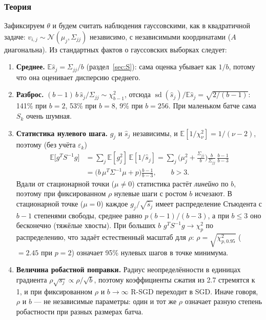 \documentclass[11pt,a4paper]{article}
\newcommand{\E}{\mathbb{E}}
\begin{document}
\subsubsection*{Теория}

Зафиксируем $\theta$ и будем считать наблюдения гауссовскими, как в квадратичной задаче:
$v_{i,j}\sim\mathcal N(\mu_j,\Sigma_{jj})$ независимо, с независимыми координатами
($A$ диагональна). Из стандартных фактов о гауссовских выборках следует:
\begin{enumerate}
\item \textbf{Среднее.} $\E\widehat s_j=\Sigma_{jj}/b$ (раздел~\ref{sec:S}): сама оценка убывает как
$1/b$, потому что она оценивает дисперсию среднего.
\item \textbf{Разброс.} $(b-1)\,b\,\widehat s_j/\Sigma_{jj}\sim\chi^2_{b-1}$, отсюда
$\operatorname{sd}(\widehat s_j)/\E\widehat s_j=\sqrt{2/(b-1)}$: 141\% при $b=2$, 53\%
при $b=8$, 9\% при $b=256$. При маленьком батче сама $S_k$ очень шумная.
\item \textbf{Статистика нулевого шага.} $g_j$ и $\widehat s_j$ независимы, и
$\E[1/\chi^2_\nu]=1/(\nu-2)$, поэтому (без учёта $\varepsilon_k$)
\begin{align*}
\E\big[g^TS^{-1}g\big]&=\sum_j\E[g_j^2]\,\E[1/\widehat s_j]
=\sum_j\Big(\mu_j^2+\frac{\Sigma_{jj}}b\Big)\frac{b}{\Sigma_{jj}}\,\frac{b-1}{b-3}\\
&=\big(b\,\mu^T\Sigma^{-1}\mu+p\big)\frac{b-1}{b-3},\qquad b>3 .
\end{align*}
Вдали от стационарной точки ($\mu\ne0$) статистика растёт \emph{линейно} по $b$,
поэтому при фиксированном $\rho$ нулевые шаги с ростом $b$ исчезают. В стационарной
точке ($\mu=0$) каждое $g_j/\sqrt{\widehat s_j}$ имеет распределение Стьюдента с $b-1$
степенями свободы, среднее равно $p(b-1)/(b-3)$, а при $b\le3$ оно бесконечно (тяжёлые
хвосты). При больших $b$ $g^TS^{-1}g\to\chi^2_p$ по распределению, что задаёт
естественный масштаб для $\rho$: $\rho=\sqrt{\chi^2_{p,0.95}}$ ($=2.45$ при $p=2$)
означает 95\% нулевых шагов в точке минимума.
\item \textbf{Величина робастной поправки.} Радиус неопределённости в единицах
градиента $\rho\sqrt{s_j}\propto\rho/\sqrt b$, поэтому коэффициенты сжатия из 2.7
стремятся к 1, и при фиксированном $\rho$ и $b\to\infty$ R-SGD переходит в SGD. Иначе
говоря, $\rho$ и $b$ — не независимые параметры: один и тот же $\rho$ означает разную
степень робастности при разных размерах батча.
\end{enumerate}
\end{document}
